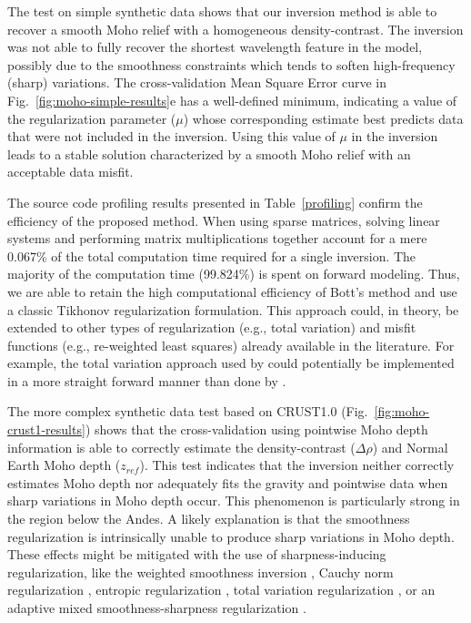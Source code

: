 The test on simple synthetic data shows that our inversion method is able to
recover a smooth Moho relief with a homogeneous density-contrast.
The inversion was not able to fully recover the shortest wavelength feature in
the model, possibly due to the smoothness constraints which tends to soften
high-frequency (sharp) variations.
The cross-validation Mean Square Error curve in Fig.~\ref{fig:moho-simple-results}e
has a well-defined minimum, indicating a value of the regularization parameter
($\mu$) whose corresponding estimate best predicts data that were not included
in the inversion.
Using this value of $\mu$ in the inversion leads to a stable solution
characterized by a smooth Moho relief with an acceptable data misfit.

The source code profiling results presented in Table~\ref{profiling}
confirm the efficiency of the proposed method.
When using sparse matrices, solving linear systems and performing matrix
multiplications together account for a mere 0.067\% of the total computation
time required for a single inversion.
The majority of the computation time (99.824\%) is spent on forward modeling.
Thus, we are able to retain the high computational efficiency of Bott's method
and use a classic Tikhonov regularization formulation.
This approach could, in theory, be extended to other types of regularization
(e.g., total variation) and misfit functions (e.g., re-weighted least squares)
already available in the literature.
For example, the total variation approach used by \citet{martins2011} could
potentially be implemented in a more straight forward manner than done by
\citet{santos2015}.

The more complex synthetic data test based on CRUST1.0
(Fig.~\ref{fig:moho-crust1-results})
shows that the cross-validation using pointwise Moho depth information
is able to correctly estimate the density-contrast ($\Delta\rho$) and Normal
Earth Moho depth ($z_{ref}$).
This test indicates that the inversion neither correctly estimates Moho depth
nor adequately fits the gravity and pointwise data when sharp variations in
Moho depth occur.
This phenomenon is particularly strong in the region below the Andes.
A likely explanation is that the smoothness regularization
is intrinsically unable to produce sharp variations in Moho depth.
These effects might be mitigated with the use of sharpness-inducing
regularization, like
the weighted smoothness inversion \citep{barbosa1999a},
Cauchy norm regularization \citep{sacchi1996, pilkington2008},
entropic regularization \citep{silva2010},
total variation regularization \citep{martins2011},
or an adaptive mixed smoothness-sharpness regularization \citep{sun2014}.

